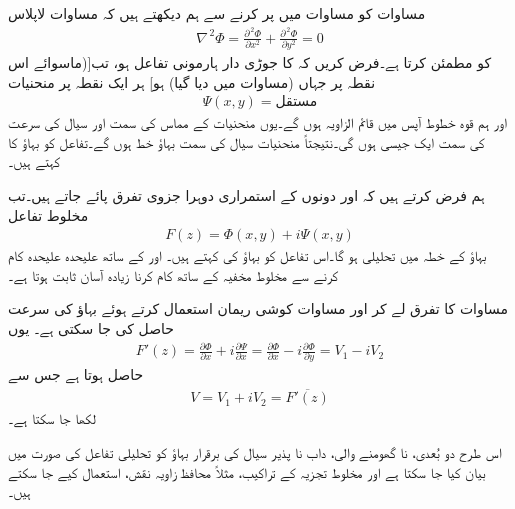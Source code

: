 مساوات  کو مساوات  میں پر کرنے سے ہم دیکھتے ہیں کہ  مساوات لاپلاس
\begin{align*}
\nabla^{\,2}\Phi=\frac{\partial^{\,2}\Phi}{\partial x^2}+\frac{\partial^{\,2}\Phi}{\partial y^2}=0
\end{align*}
کو مطمئن کرتا ہے۔فرض کریں کہ  کا جوڑی دار ہارمونی تفاعل  ہو، تب[(ماسوائے اس نقطہ پر جہاں (مساوات  میں دیا گیا)  ہو] ہر ایک نقطہ پر منحنیات
\begin{align*}
\Psi(x,y)=\text{مستقل}
\end{align*}
اور ہم قوہ خطوط  آپس میں قائم الزاویہ ہوں گے۔یوں  منحنیات  کے مماس کی سمت اور سیال کی  سرعت کی سمت ایک جیسی ہوں گی۔نتیجتاً منحنیات  سیال کی سمت بہاؤ خط ہوں گے۔تفاعل  کو بہاؤ کا  کہتے ہیں۔

ہم فرض کرتے ہیں کہ  اور  دونوں کے استمراری دوہرا جزوی تفرق پائے جاتے ہیں۔تب مخلوط تفاعل 
\begin{align}\label{مساوات_مخفی_قوہ_مخلوط_تفاعل_مخفی_بہاو}
F(z)=\Phi(x,y)+i\Psi(x,y)
\end{align}
بہاؤ کے خطہ میں تحلیلی ہو گا۔اس تفاعل کو بہاؤ کی  کہتے ہیں۔ اور  کے ساتھ علیحدہ علیحدہ کام کرنے سے مخلوط مخفیہ کے ساتھ کام کرنا زیادہ آسان ثابت ہوتا ہے۔

مساوات  کا تفرق لے کر اور مساوات کوشی ریمان استعمال کرتے ہوئے بہاؤ کی  سرعت حاصل کی جا سکتی ہے۔ یوں
\begin{align*}
F'(z)=\frac{\partial \Phi}{\partial x}+i\frac{\partial \Psi}{\partial x}=\frac{\partial \Phi}{\partial x}-i\frac{\partial \Phi}{\partial y}=V_1-iV_2
\end{align*}
حاصل ہوتا ہے جس سے
\begin{align}\label{مساوات_مخفی_قوہ_سیال_اہم_مساوات}
V=V_1+iV_2=\overline{F'(z)}
\end{align}
لکھا جا سکتا ہے۔

اس طرح دو بُعدی، نا گھومنے والی، داب نا پذیر سیال کی برقرار بہاؤ کو تحلیلی تفاعل کی صورت میں بیان کیا جا سکتا ہے اور مخلوط تجزیہ کے تراکیب، مثلاً محافظ زاویہ نقش، استعمال کیے جا سکتے ہیں۔  

